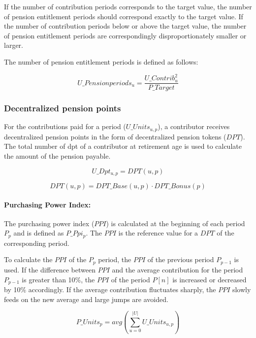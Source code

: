 If the number of contribution periods corresponds to the target value, the number of pension entitlement periods should correspond exactly to the target value. If the number of contribution periods below or above the target value, the number of pension entitlement periods are correspondingly disproportionately smaller or larger.  

The number of pension entitlement periods is defined as follows:

\begin{equation}
U\_Pensionperiods_{u} = \frac{U\_Contrib_{u}^2}{P\_Target}
\end{equation}


\subsubsection{Decentralized pension points}

For the contributions paid for a period ($U\_Units_{u,p}$), a contributor receives decentralized pension points in the form of decentralized pension tokens ($DPT$). The total number of \gls{dpt} of a contributor at retirement age is used to calculate the amount of the pension payable.

\begin{equation}
U\_Dpt_{u,p} = DPT(u, p)
\end{equation}

\begin{equation}
DPT(u, p) = DPT\_Base(u, p) \cdot DPT\_Bonus(p)
\end{equation}

\paragraph*{Purchasing Power Index:}

The purchasing power index ($PPI$) is calculated at the beginning of each period $P_{p}$ and is defined as $P\_Ppi_{p}$. The $PPI$ is the reference value for a $DPT$ of the corresponding period.

To calculate the $PPI$ of the $P_{p}$ period, the $PPI$ of the previous period $P_{p-1}$ is used.
If the difference between $PPI$ and the average contribution for the period $P_{p-1}$ is greater than 10\%, the $PPI$ of the period $P[n]$ is increased or decreased by 10\% accordingly.
If the average contribution fluctuates sharply, the $PPI$ slowly feeds on the new average and large jumps are avoided.

\begin{equation}
P\_Units_{p} = avg(\sum_{u=0}^{|U|} U\_Units_{u,p})
\end{equation}

